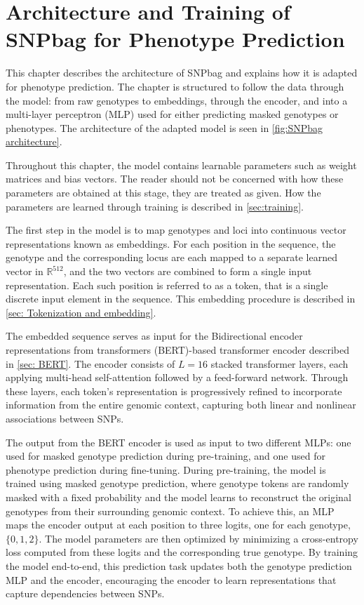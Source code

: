 \chapter{Architecture and Training of SNPbag for Phenotype Prediction}
\label{ch:SNPbag}

This chapter describes the architecture of SNPbag \citep{SNPbag} and explains how it is adapted for phenotype prediction. The chapter is structured to follow the data through the model: from raw genotypes to embeddings, through the encoder, and into a multi-layer perceptron (MLP) used for either predicting masked genotypes or phenotypes. The architecture of the adapted model is seen in \autoref{fig:SNPbag architecture}.

Throughout this chapter, the model contains learnable parameters such
as weight matrices and bias vectors. The reader should not be concerned
with how these parameters are obtained at this stage, they are treated as given. How the parameters are learned through training is described in \autoref{sec:training}.

The first step in the model is to map genotypes and loci into continuous vector representations known as embeddings. For each position in the sequence, the genotype and the corresponding locus are each mapped to a separate learned vector in $\mathbb{R}^{512}$, and the two vectors are combined to form a single input representation. Each such position is referred to as a token, that is a single discrete input element in the sequence. This embedding procedure is described in
\autoref{sec: Tokenization and embedding}.

The embedded sequence serves as input for the Bidirectional encoder representations from transformers (BERT)-based transformer encoder described in \autoref{sec: BERT}. The encoder consists of $L = 16$ stacked transformer layers, each applying multi-head self-attention followed by a feed-forward network. Through these layers, each token's representation is progressively refined to incorporate information from the entire genomic context, capturing both linear and nonlinear associations between SNPs.

The output from the BERT encoder is used as input to two different MLPs: one used for masked genotype prediction during pre-training, and one used for phenotype prediction during fine-tuning. During pre-training, the model is trained using masked genotype prediction, where genotype tokens are randomly masked with a fixed probability and the model learns to reconstruct the original genotypes from their surrounding genomic context. To achieve this, an MLP maps the encoder output at each position to three logits, one for each genotype, $\{0,1,2\}$. The model parameters are then optimized by minimizing a cross-entropy loss computed from these logits and the corresponding true genotype. By training the model end-to-end, this prediction task updates both the genotype prediction MLP and the encoder, encouraging the encoder to learn representations that capture dependencies between SNPs.

